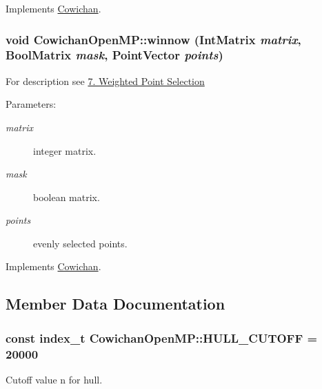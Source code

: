 Implements \hyperlink{class_cowichan_775d72b5e7d122f9f32555352278250e}{Cowichan}.\hypertarget{class_cowichan_open_m_p_4a518f2b5590d4acd670f333471a380a}{
\subsubsection[{winnow}]{\setlength{\rightskip}{0pt plus 5cm}void CowichanOpenMP::winnow ({\bf IntMatrix} {\em matrix}, \/  {\bf BoolMatrix} {\em mask}, \/  {\bf PointVector} {\em points})}}
\label{class_cowichan_open_m_p_4a518f2b5590d4acd670f333471a380a}


For description see \hyperlink{index_winnow_sec}{7. Weighted Point Selection} \begin{Desc}
\item[Parameters:]
\begin{description}
\item[{\em matrix}]integer matrix. \item[{\em mask}]boolean matrix. \item[{\em points}]evenly selected points. \end{description}
\end{Desc}


Implements \hyperlink{class_cowichan_13d60e06ced3b5da79d62c133ce82337}{Cowichan}.

\subsection{Member Data Documentation}
\hypertarget{class_cowichan_open_m_p_52ddfbbead2e1c115806cd07f5630bf5}{
\subsubsection[{HULL\_\-CUTOFF}]{\setlength{\rightskip}{0pt plus 5cm}const {\bf index\_\-t} {\bf CowichanOpenMP::HULL\_\-CUTOFF} = 20000}}
\label{class_cowichan_open_m_p_52ddfbbead2e1c115806cd07f5630bf5}


Cutoff value n for hull. 

